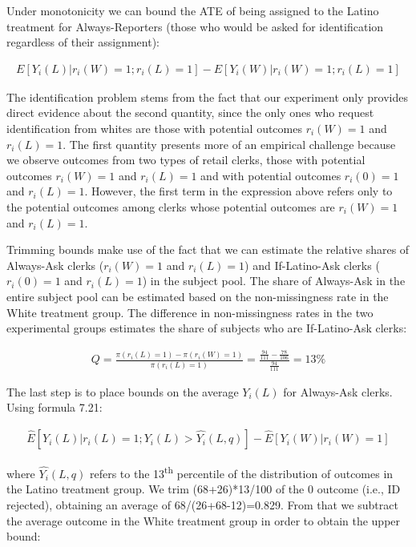 \documentclass[11pt,notitlepage]{article}\usepackage[]{graphicx}\usepackage[]{color}
\begin{document}
\begin{enumerate}[a)]
Under monotonicity we can bound the ATE of being assigned to the Latino treatment for Always-Reporters (those who would be asked for identification regardless of their assignment):

\begin{align*}
E[Y_i(L)|r_i(W)=1; r_i(L)=1]-E[Y_i(W)| r_i(W)=1; r_i(L)=1]
\end{align*}


The identification problem stems from the fact that our experiment only provides direct evidence about the second quantity, since the only ones who request identification from whites are those with potential outcomes $r_i(W)=1$ and $r_i(L)=1$.  The first quantity presents more of an empirical challenge because we observe outcomes from two types of retail clerks, those with potential outcomes $r_i(W)=1$ and $r_i(L)=1$ and with potential outcomes $r_i(0)=1$ and $r_i(L)=1$. However, the first term in the expression above refers only to the potential outcomes among clerks whose potential outcomes are $r_i(W)=1$ and $r_i(L)=1$.  

Trimming bounds make use of the fact that we can estimate the relative shares of Always-Ask clerks ($r_i(W)=1$ and $r_i(L)=1$) and If-Latino-Ask clerks ($r_i(0)=1$ and $r_i(L)=1$) in the subject pool. The share of Always-Ask in the entire subject pool can be estimated based on the non-missingness rate in the White treatment group. The difference in non-missingness rates in the two experimental groups estimates the share of subjects who are If-Latino-Ask clerks:

\begin{align*}
Q = \frac{\pi(r_i(L)=1) - \pi(r_i(W)=1)}{\pi(r_i(L)=1)} = \frac{\frac{94}{111} - \frac{78}{106}}{\frac{94}{111}} = 13\%
\end{align*}


The last step is to place bounds on the average $Y_i (L)$ for Always-Ask clerks.  Using formula 7.21:

\begin{align*}
\hat{E}[Y_i(L)|r_i(L)=1; Y_i(L) > \hat{Y_i}(L,q)] - \hat{E}[Y_i(W) | r_i(W)=1]
\end{align*}

where $\hat{Y_i}(L,q)$ refers to the 13\textsuperscript{th} percentile of the distribution of outcomes in the Latino treatment group. We trim (68+26)*13/100 of the 0 outcome (i.e., ID rejected), obtaining an average of 68/(26+68-12)=0.829. From that we subtract the average outcome in the White treatment group in order to obtain the upper bound: 


\end{enumerate}
\end{document}
